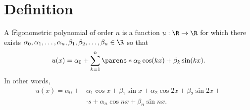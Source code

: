 

\section*{Definition}

A \t{trigonometric polynomial} of order $n$ is a function $u: \R  \to \R $ for which there exists $\alpha _0, \alpha _1, \dots , \alpha _n, \beta _1, \beta _2, \dots , \beta _n \in \R $ so that
\[
u(x) = \alpha _0 + \sum_{k = 1}^{n} \parens*{\alpha _k \cos(kx) + \beta _k \sin(kx)}.
\]
In other words,
\[
\begin{aligned}
u(x) = \alpha _0 +& \alpha _1\cos x + \beta _1\sin x + \alpha _2 \cos2x + \beta _2 \sin2x + \\ &\cdot s + \alpha _n \cos nx + \beta _n \sin nx.
\end{aligned}
\]

\blankpage